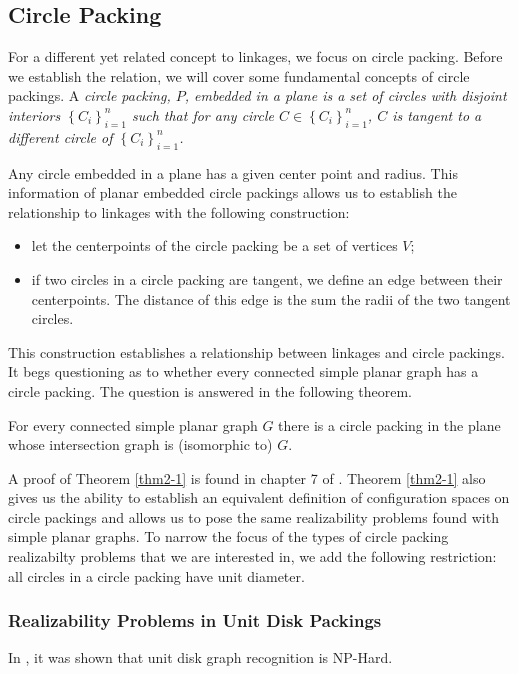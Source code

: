 \subsection{Circle Packing}
For a different yet related concept to linkages, we focus on circle packing.  Before we establish the relation, we will cover some fundamental concepts of circle packings.  A \it{circle packing}, $P$, embedded in a plane  is a set of circles with disjoint interiors $\left\lbrace C_i \right\rbrace_{i = 1}^n $ such that for any circle $C \in \left\lbrace C_i \right\rbrace_{i = 1}^n$, $C$ is tangent to a different circle of $\left\lbrace C_i \right\rbrace_{i = 1}^n$. 

Any circle embedded in a plane has a given center point and radius.  This information of planar embedded circle packings allows us to establish the relationship to linkages with the following construction:
\begin{itemize}
\item[\rn{1}] let the centerpoints of the circle packing be a set of vertices $V$;
\item[\rn{2}] if two circles in a circle packing are tangent, we define an edge between their centerpoints.  The distance of this edge is the sum the radii of the two tangent circles.
\end{itemize}  
This construction establishes a relationship between linkages and circle packings.  It begs questioning as to whether every connected simple planar graph has a circle packing.  The question is answered in the following theorem.
\begin{thm}\label{thm2-1}
For every connected simple planar graph $G$ there is a circle packing in the
plane whose intersection graph is (isomorphic to) $G$.
\end{thm}
A proof of Theorem \ref{thm2-1} is found in chapter 7 of \cite{stephenson2005introduction}.  Theorem \ref{thm2-1} also gives us the ability to establish an equivalent definition of configuration spaces on circle packings and allows us to pose the same realizability problems found with simple planar graphs.  To narrow the focus of the types of circle packing realizabilty problems that we are interested in, we add the following restriction: all circles in a circle packing have unit diameter. 
\subsubsection{Realizability Problems in Unit Disk Packings}
In \cite{Breu19983}, it was shown that unit disk graph recognition is NP-Hard. 
